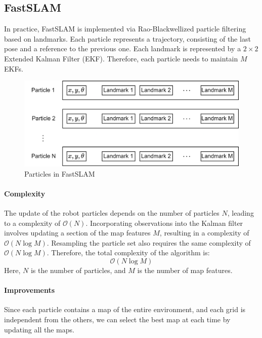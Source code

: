 \subsection{FastSLAM}
In practice, FastSLAM is implemented via Rao-Blackwellized particle filtering based on landmarks. 
Each particle represents a trajectory, consisting of the last pose and a reference to the previous one. 
Each landmark is represented by a $2\times 2$ Extended Kalman Filter (EKF). 
Therefore, each particle needs to maintain $M$ EKFs.
\begin{figure}[H]
    \centering
    \includegraphics[width=0.75\linewidth]{images/fast.png}
    \caption{Particles in FastSLAM}
\end{figure}

\paragraph*{Complexity}
The update of the robot particles depends on the number of particles $N$, leading to a complexity of $\mathcal{O}(N)$. 
Incorporating observations into the Kalman filter involves updating a section of the map features $M$, resulting in a complexity of $\mathcal{O}(N\log M)$. 
Resampling the particle set also requires the same complexity of $\mathcal{O}(N\log M)$. 
Therefore, the total complexity of the algorithm is:
\[\mathcal{O}(N\log M)\]
Here, $N$ is the number of particles, and $M$ is the number of map features.

\paragraph{Improvements}
Since each particle contains a map of the entire environment, and each grid is independent from the others, we can select the best map at each time by updating all the maps.